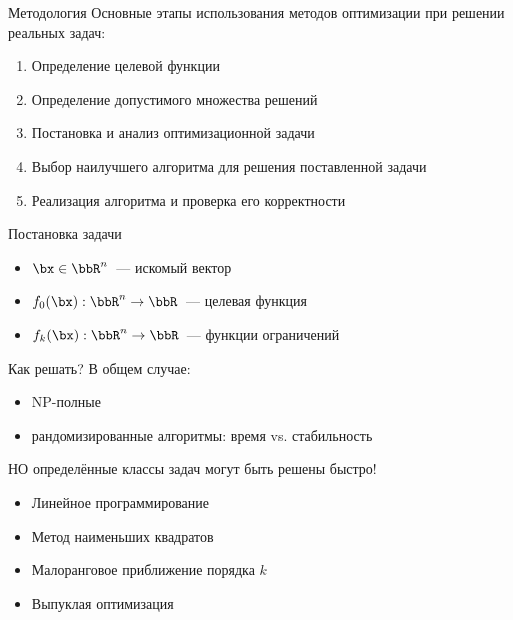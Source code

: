 \documentclass[12pt]{beamer}
\begin{document}
\begin{frame}{Методология}
Основные этапы использования методов оптимизации при решении реальных задач:
\begin{enumerate}[<+->]
\item Определение целевой функции
\item Определение допустимого множества решений
\item Постановка и анализ оптимизационной задачи
\item Выбор наилучшего алгоритма для решения поставленной задачи
\item Реализация алгоритма и проверка его корректности
\end{enumerate}

\end{frame}

\begin{frame}{Постановка задачи}
\begin{itemize}[<+->]
\item $\bx \in \bbR^n$~--- искомый вектор
\item $f_0(\bx): \bbR^n \rightarrow \bbR$~--- целевая функция
\item $f_k(\bx): \bbR^n \rightarrow \bbR$~--- функции ограничений
\end{itemize}
\end{frame}

\begin{frame}{Как решать?}
В общем случае:
\begin{itemize}
\item NP-полные
\item {\small рандомизированные алгоритмы: время vs. стабильность}
\end{itemize}

{\small НО определённые классы задач могут быть решены быстро!}

\begin{itemize}
\item Линейное программирование
\item Метод наименьших квадратов
\item Малоранговое приближение порядка $k$
\item Выпуклая оптимизация
\end{itemize}
\end{frame}
\end{document}
